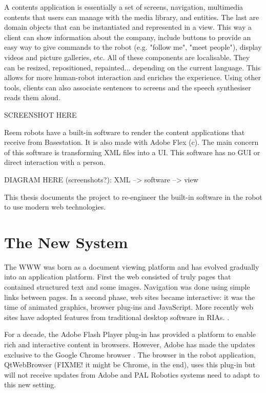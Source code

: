 A contents application is essentially a set of screens, navigation, multimedia contents that users can manage with the media library, and entities. 
The last are domain objects that can be instantiated and represented in a view. 
This way a client can show information about the company, include buttons to provide an easy way to give commands to the robot (e.g. "follow me", "meet people"), display videos and picture galleries, etc.
All of these components are localisable. 
They can be resized, repositioned, repainted... depending on the current language.
This allows for more human-robot interaction and enriches the experience. 
Using other tools, clients can also associate sentences to screens and the speech synthesiser reads them aloud.

SCREENSHOT HERE

Reem robots have a built-in software to render the content applications that receive from Basestation. 
It is also made with Adobe Flex (c).
The main concern of this software is transforming \ac{XML} files into a \ac{UI}. 
This software has no \ac{GUI} or direct interaction with a person.

DIAGRAM HERE (screenshots?): XML --> software --> view

This thesis documents the project to re-engineer the built-in software in the robot to use modern web technologies.

\section{The New System}
The \ac{WWW} was born as a document viewing platform and has evolved gradually into an application platform. 
First the web consisted of truly pages that contained structured text and some images. 
Navigation was done using simple links between pages. 
In a second phase, web sites became interactive: 
it was the time of animated graphics, browser plug-ins and JavaScript. 
More recently web sites have adopted features from traditional desktop software in \acp{RIA}. \cite{Anttonen:2011}.

For a decade, the Adobe Flash Player plug-in has provided a platform to enable rich and interactive content in browsers.
However, Adobe has made the updates exclusive to the Google Chrome browser \cite{FlashRoadmap}. 
The browser in the robot application, QtWebBrowser (FIXME! it might be Chrome, in the end), uses this plug-in but will not receive updates from Adobe and PAL Robotics systems need to adapt to this new setting. 

